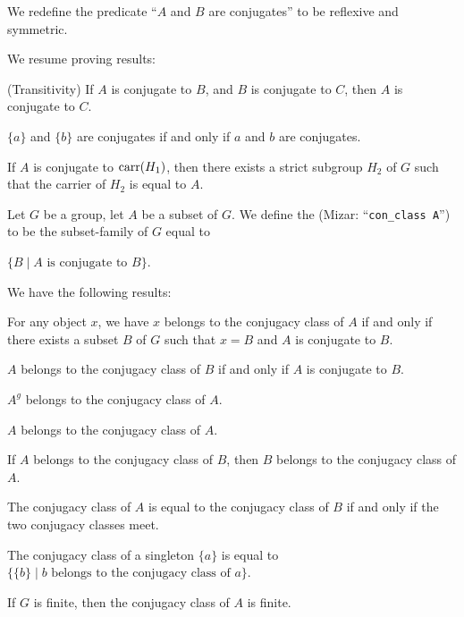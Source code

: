 \documentclass{article}
\begin{document}
\begin{definition}
We redefine the predicate ``$A$ and $B$ are conjugates'' to be reflexive
and symmetric.
\end{definition}

We resume proving results:
\begin{thm}
\item\label{group3:91} (Transitivity) If $A$ is conjugate to $B$, and
  $B$ is conjugate to $C$, then $A$ is conjugate to $C$.
\item\label{group3:92} $\{a\}$ and $\{b\}$ are conjugates if and only if
  $a$ and $b$ are conjugates.
\item\label{group3:93} If $A$ is conjugate to $\operatorname{carr}(H_{1})$, then there
  exists a strict subgroup $H_{2}$ of $G$ such that the carrier of
  $H_{2}$ is equal to $A$.
\end{thm}

\begin{definition}
Let $G$ be a group, let $A$ be a subset of $G$.
We define the  (Mizar: ``\verb#con_class A#'')
to be the subset-family of $G$ equal to
\begin{defn}
\item $\{B\mid A\mbox{ is conjugate to }B\}$.
\end{defn}
\end{definition}

We have the following results:
\begin{thm}
\item\label{group3:94} For any object $x$, we have
  $x$ belongs to the conjugacy class of $A$ if and
  only if there exists a subset $B$ of $G$ such that $x=B$ and $A$ is
  conjugate to $B$.
\item\label{group3:95} $A$ belongs to the conjugacy class of $B$ if and
  only if $A$ is conjugate to $B$.
\item\label{group3:96} $A^{g}$ belongs to the conjugacy class of $A$.
\item\label{group3:97} $A$ belongs to the conjugacy class of $A$.
\item\label{group3:98} If $A$ belongs to the conjugacy class of $B$,
  then $B$ belongs to the conjugacy class of $A$.
\item\label{group3:99} The conjugacy class of $A$ is equal to the
  conjugacy class of $B$ if and only if the two conjugacy classes meet.
\item\label{group3:100} The conjugacy class of a singleton $\{a\}$ is
  equal to $\{\{b\}\mid b\mbox{ belongs to the conjugacy class of }a\}$.
\item\label{group3:101} If $G$ is finite, then the conjugacy class of
  $A$ is finite.
\end{thm}
\end{document}
